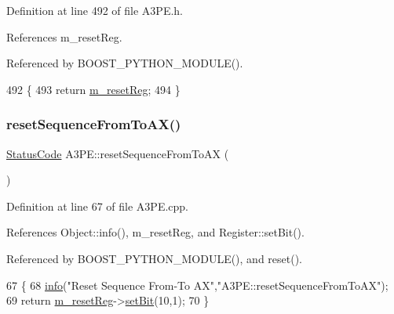 Definition at line 492 of file A3\+P\+E.\+h.



References m\+\_\+reset\+Reg.



Referenced by B\+O\+O\+S\+T\+\_\+\+P\+Y\+T\+H\+O\+N\+\_\+\+M\+O\+D\+U\+L\+E().


\begin{DoxyCode}
492                       \{
493     \textcolor{keywordflow}{return} \hyperlink{classA3PE_ab4db5f00976e5095686f108c8febf702}{m\_resetReg};
494   \}
\end{DoxyCode}
\mbox{\label{classA3PE_a6015ba83a7b828efb1969291ab740eee}} 
\subsubsection{\texorpdfstring{reset\+Sequence\+From\+To\+A\+X()}{resetSequenceFromToAX()}}
{\footnotesize\ttfamily \hyperlink{classStatusCode}{Status\+Code} A3\+P\+E\+::reset\+Sequence\+From\+To\+AX (\begin{DoxyParamCaption}{ }\end{DoxyParamCaption})}



Definition at line 67 of file A3\+P\+E.\+cpp.



References Object\+::info(), m\+\_\+reset\+Reg, and Register\+::set\+Bit().



Referenced by B\+O\+O\+S\+T\+\_\+\+P\+Y\+T\+H\+O\+N\+\_\+\+M\+O\+D\+U\+L\+E(), and reset().


\begin{DoxyCode}
67                                       \{
68   \hyperlink{classObject_a644fd329ea4cb85f54fa6846484b84a8}{info}(\textcolor{stringliteral}{"Reset Sequence From-To AX"},\textcolor{stringliteral}{"A3PE::resetSequenceFromToAX"});
69   \textcolor{keywordflow}{return} \hyperlink{classA3PE_ab4db5f00976e5095686f108c8febf702}{m\_resetReg}->\hyperlink{classRegister_ab094246dd12aa7e0aa0ca917f4e70b31}{setBit}(10,1);
70 \}
\end{DoxyCode}
\mbox{\label{classA3PE_ae164123b49f8c4d1d119dbf201f0a839}} 
